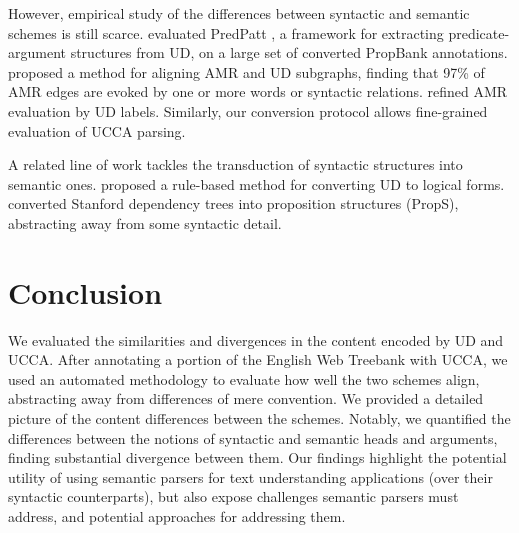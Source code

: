 \documentclass[11pt,a4paper,table]{article}
\begin{document}

  
However, empirical study of
the differences between syntactic and semantic schemes is still scarce.
 evaluated PredPatt \citep{white2016universal},
a framework for extracting predicate-argument structures from UD,
on a large set of converted PropBank annotations.
 proposed a method for aligning AMR and UD subgraphs,
finding that 97\% of AMR edges are evoked by one or more
words or syntactic relations.
 refined AMR evaluation by UD labels.
Similarly, our conversion protocol allows fine-grained evaluation of UCCA parsing.

A related line of work tackles the transduction of syntactic structures into semantic ones.
 proposed a rule-based method for converting UD
to logical forms. 
 converted Stanford dependency trees into
proposition structures ({\sc PropS}), abstracting away from some syntactic detail.


\section{Conclusion}\label{sec:conclusion}

We evaluated the similarities and divergences in the content encoded by UD and UCCA. 
After annotating a portion of the English Web Treebank with UCCA,
  we used an automated methodology to evaluate how well the two schemes align,
  abstracting away from differences of mere convention.
We provided a detailed picture of the content differences between the schemes.
Notably, we quantified the differences between the notions of syntactic and semantic heads
  and arguments, finding substantial divergence between them.
Our findings highlight the potential utility of using semantic parsers for text understanding applications
  (over their syntactic counterparts), but also expose challenges semantic parsers must address,
  and potential approaches for addressing them.
\end{document}
